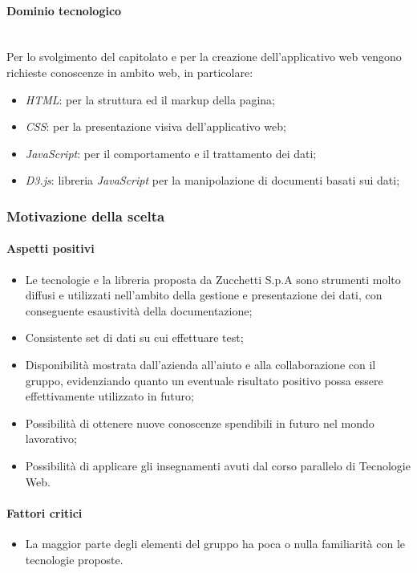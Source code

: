 \documentclass[11pt]{article}
\begin{document}
        \paragraph{Dominio tecnologico}~\\
        
        \noindent
        Per lo svolgimento del capitolato e per la creazione dell'applicativo web vengono richieste conoscenze in ambito web, in
        particolare:
        \begin{itemize}
            \item \textit{HTML}: per la struttura ed il markup della pagina;
            \item \textit{CSS}: per la presentazione visiva dell'applicativo web;
            \item \textit{JavaScript}: per il comportamento e il trattamento dei dati;
            \item \textit{D3.js}: libreria \textit{JavaScript} per la manipolazione di documenti basati sui dati;
        \end{itemize}
    
    \subsubsection{Motivazione della scelta}
        \paragraph{Aspetti positivi}
        \begin{itemize}
            \item Le tecnologie e la libreria proposta da Zucchetti S.p.A sono strumenti molto diffusi e utilizzati nell'ambito della
            gestione e presentazione dei dati, con conseguente esaustività della documentazione;
            \item Consistente set di dati su cui effettuare test;
            \item Disponibilità mostrata dall'azienda all'aiuto e alla collaborazione con il gruppo, evidenziando quanto un eventuale
            risultato positivo possa essere effettivamente utilizzato in futuro;
            \item Possibilità di ottenere nuove conoscenze spendibili in futuro nel mondo lavorativo;
            \item Possibilità di applicare gli insegnamenti avuti dal corso parallelo di Tecnologie Web.
        \end{itemize}
        \paragraph{Fattori critici}
        \begin{itemize}
            \item La maggior parte degli elementi del gruppo ha poca o nulla familiarità con le tecnologie proposte.
        \end{itemize}
    
\end{document}
